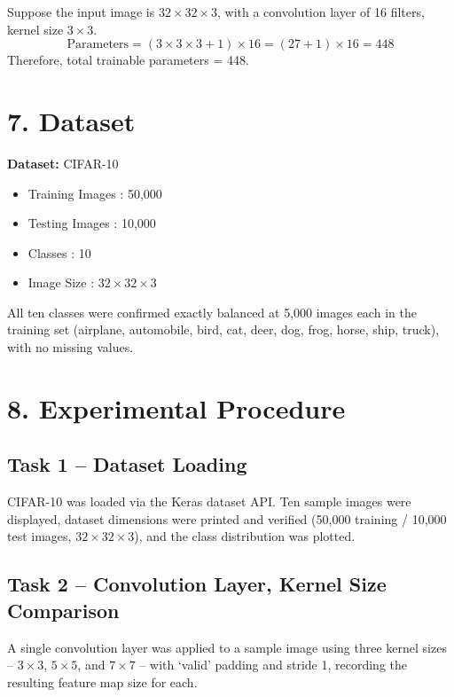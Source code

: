 \documentclass[11pt]{article}
\begin{document}
Suppose the input image is $32\times32\times3$, with a convolution layer of 16 filters, kernel size $3\times3$.
\[
\text{Parameters} = (3\times3\times3+1)\times16 = (27+1)\times16 = 448
\]
Therefore, total trainable parameters = 448.


\section*{7. Dataset}

\textbf{Dataset:} CIFAR-10

\begin{itemize}[leftmargin=*]
\item Training Images : 50,000
\item Testing Images : 10,000
\item Classes : 10
\item Image Size : $32\times32\times3$
\end{itemize}

All ten classes were confirmed exactly balanced at 5,000 images each in the training set (airplane, automobile, bird, cat, deer, dog, frog, horse, ship, truck), with no missing values.


\section*{8. Experimental Procedure}

\subsection*{Task 1 -- Dataset Loading}
CIFAR-10 was loaded via the Keras dataset API. Ten sample images were displayed, dataset dimensions were printed and verified (50,000 training / 10,000 test images, $32\times32\times3$), and the class distribution was plotted.

\subsection*{Task 2 -- Convolution Layer, Kernel Size Comparison}
A single convolution layer was applied to a sample image using three kernel sizes -- $3\times3$, $5\times5$, and $7\times7$ -- with `valid' padding and stride 1, recording the resulting feature map size for each.
\end{document}
